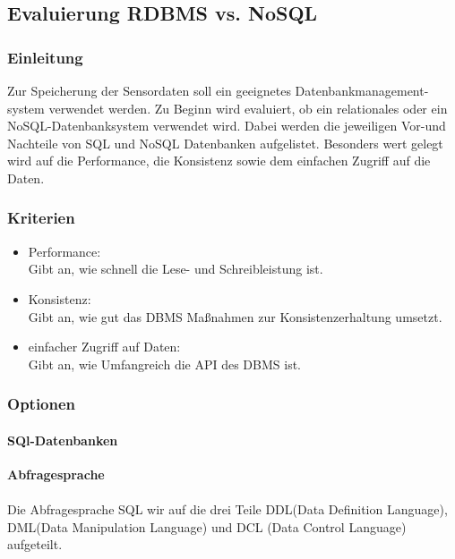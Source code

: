 \documentclass[11pt]{article}
\begin{document}
\subsection{Evaluierung RDBMS vs. NoSQL}

\subsubsection{Einleitung}
Zur Speicherung der Sensordaten soll ein geeignetes Datenbankmanagement-\\ system verwendet werden. Zu Beginn wird evaluiert, ob ein relationales oder ein NoSQL-Datenbanksystem verwendet wird. Dabei werden die jeweiligen Vor-und Nachteile von SQL und NoSQL Datenbanken aufgelistet. Besonders wert gelegt wird auf die Performance, die Konsistenz sowie dem einfachen Zugriff auf die Daten.

\subsubsection{Kriterien}

\begin{itemize}
	\item Performance: \\Gibt an, wie schnell die Lese- und Schreibleistung ist.
	\item Konsistenz: \\Gibt an, wie gut das DBMS Ma{\ss}nahmen zur Konsistenzerhaltung umsetzt.
	\item einfacher Zugriff auf Daten: \\Gibt an, wie Umfangreich die API des DBMS ist.
\end{itemize}

\subsubsection{Optionen}

\paragraph{SQl-Datenbanken}

\textbf{Abfragesprache}\\\\
Die Abfragesprache SQL wir auf die drei Teile DDL(Data Definition Language),
DML(Data Manipulation Language) und DCL (Data Control Language) aufgeteilt.
\end{document}
